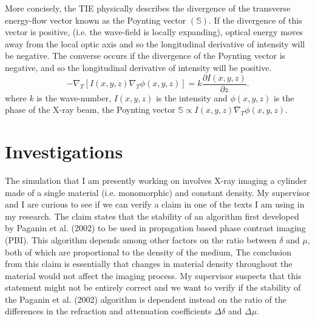 \documentclass[9pt, a4paper]{article}
\begin{document}
More concisely, the TIE physically describes the divergence of the transverse energy-flow vector known as the Poynting vector $(\mathbb{S})$. If the divergence of this vector is positive, (i.e. the wave-field is locally expanding), optical energy moves away from the local optic axis and so the longitudinal derivative of
intensity will be negative. The converse occurs if the divergence of the Poynting vector is negative, and so the longitudinal derivative of intensity will be positive\cite{PagsTutes}.
\begin{equation}\label{eq:15}
-\nabla_{T} [I(x, y, z) \nabla_{T} \phi(x, y, z)] = k \frac{\partial I (x, y, z)}{\partial z}.
\end{equation}
where $k$ is the wave-number, $I(x, y, z)$ is the intensity and $\phi(x, y, z)$ is the phase of the X-ray beam, the Poynting vector $\mathbb{S} \propto I(x, y, z) \nabla_{T} \phi(x, y, z)$.

\section{Investigations}
The simulation that I am presently working on involves X-ray imaging a cylinder made of a single material (i.e. monomorphic) and constant density. My supervisor and I are curious to see if we can verify a claim in one of the texts I am using in my research. The claim states that the stability of an algorithm first developed by Paganin et al. (2002)\cite{Pags2002}\cite{CH49} to be used in propagation based phase contrast imaging (PBI). This algorithm depends among other factors on the ratio between $\delta$ and $\mu$, both of which are proportional to the density of the medium, The conclusion from this claim is essentially that changes in material density throughout the material would not affect the imaging process. My supervisor suspects that this statement might not be entirely correct and we want to verify if the stability of the Paganin et al. (2002) algorithm is dependent instead on the ratio of the differences in the refraction and attenuation coefficients $\Delta \delta$ and $\Delta \mu$.
\end{document}
